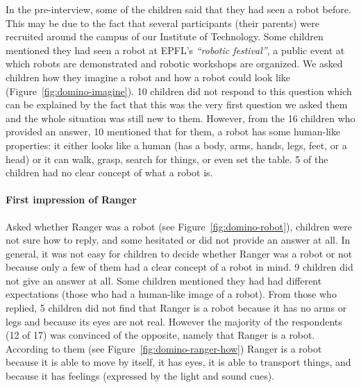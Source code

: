 \documentclass{sig-alternate}
\begin{document}
In the pre-interview, some of the children said that they had seen a robot
before. This may be due to the fact that several participants (their parents)
were recruited around the campus of our Institute of Technology. Some children
mentioned they had seen a robot at EPFL's \textit{``robotic festival''}, a
public event at which robots are demonstrated and robotic workshops are
organized. We asked children how they imagine a robot and how a robot could look
like (Figure~\ref{fig:domino-imagine}). 10 children did not respond to this
question which can be explained by the fact that this was the very first
question we asked them and the whole situation was still new to them. However,
from the 16 children who provided an answer, 10 mentioned that for them, a robot
has some human-like properties: it either looks like a human (has a body, arms,
hands, legs, feet, or a head) or it can walk, grasp, search for things, or even
set the table. 5 of the children had no clear concept of what a robot is.
	

\paragraph{First impression of Ranger}

Asked whether Ranger was a robot (see Figure~\ref{fig:domino-robot}), children
were not sure how to reply, and some hesitated or did not provide an answer at
all. In general, it was not easy for children to decide whether Ranger was a
robot or not because only a few of them had a clear concept of a robot in mind.
9 children did not give an answer at all. Some children mentioned they had had
different expectations (those who had a human-like image of a robot). From those
who replied, 5 children did not find that Ranger is a robot because it has no
arms or legs and because its eyes are not real. However the majority of the
respondents (12 of 17) was convinced of the opposite, namely that Ranger is a
robot. According to them (see Figure~\ref{fig:domino-ranger-how}) Ranger is a
robot because it is able to move by itself, it has eyes, it is able to transport
things, and because it has feelings (expressed by the light and sound cues).
\end{document}

